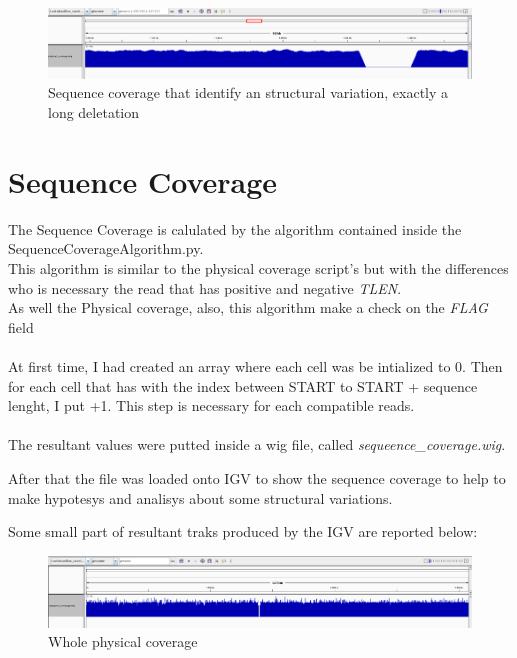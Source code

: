 				
				
 \begin{figure}[H]
				\centering
				\includegraphics[scale=0.6]{immagini/physical_coverage_3.png}
				\caption{Sequence coverage that identify an structural variation, exactly a long deletation}\label{fig:8}
				\end{figure}				


\section{Sequence Coverage}
The Sequence Coverage is calulated by the algorithm contained inside the SequenceCoverageAlgorithm.py.\\
This algorithm is similar to the physical coverage script's but with the differences who is necessary the read that has positive and negative \emph{TLEN}.\\
As well the Physical coverage, also, this algorithm make a check on the \emph{FLAG} field
\\
\\

At first time, I had created an array where each cell was be intialized to 0.
Then for each cell that has with the index between START to START + sequence lenght, I put +1.
This step is necessary for each compatible reads.\\\\

The resultant values were putted inside a wig file, called \emph{sequeence\_coverage.wig}.

After that the file was loaded onto IGV to show the sequence coverage to help to make hypotesys and analisys about some structural variations.

Some small part of resultant traks produced by the IGV are reported below:


 \begin{figure}[H]
				\centering
				\includegraphics[scale=0.6]{immagini/sequence_coverage_1.png}
				\caption{Whole physical coverage}\label{fig:9}
				\end{figure}


